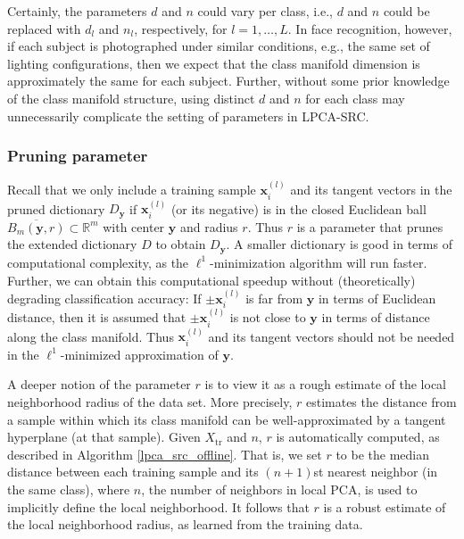 \documentclass[review]{elsarticle}
\begin{document}
\begin{rem}
Certainly, the parameters $d$ and $n$ could vary per class, i.e., $d$ and $n$ could be replaced with $d_l$ and $n_l$, respectively, for $l=1,\ldots,L$. In face recognition, however, if each subject is photographed under similar conditions, e.g., the same set of lighting configurations, then we expect that the class manifold dimension is approximately the same for each subject. Further, without some prior knowledge of the class manifold structure, using distinct $d$ and $n$ for each class may unnecessarily complicate the setting of parameters in LPCA-SRC.
\end{rem}



\subsubsection{Pruning parameter} 

Recall that we only include a training sample $\bm{x}_i^{(l)}$ and its tangent vectors in the pruned dictionary $D_{\bm{y}}$ if $\bm{x}_i^{(l)}$ (or its negative) is in the closed Euclidean ball $\overline{B_m(\bm{y}, r)} \subset \mathbb{R}^m$ with center $\bm{y}$ and radius $r$. Thus $r$ is a parameter that prunes the extended dictionary $D$ to obtain $D_{\bm{y}}$. A smaller dictionary is good in terms of computational complexity, as the $\ell^1$-minimization algorithm will run faster. Further, we can obtain this computational speedup without (theoretically) degrading classification accuracy: If $\pm\bm{x}_i^{(l)}$ is far from $\bm{y}$ in terms of Euclidean distance, then it is assumed that $\pm\bm{x}_i^{(l)}$ is not close to $\bm{y}$ in terms of distance along the class manifold. Thus $\bm{x}_i^{(l)}$ and its tangent vectors should not be needed in the $\ell^1$-minimized approximation of $\bm{y}$.

A deeper notion of the parameter $r$ is to view it as a rough estimate of the local neighborhood radius of the data set. More precisely, $r$ estimates the distance from a sample within which its class manifold can be well-approximated by a tangent hyperplane (at that sample). Given $X_{\mathrm{tr}}$ and $n$, $r$ is automatically computed, as described in Algorithm \ref{lpca_src_offline}. That is, we set $r$ to be the median distance between each training sample and its $(n+1)$st nearest neighbor (in the same class), where $n$, the number of neighbors in local PCA, is used to implicitly define the local neighborhood. It follows that $r$ is a robust estimate of the local neighborhood radius, as learned from the training data. 
\end{document}

